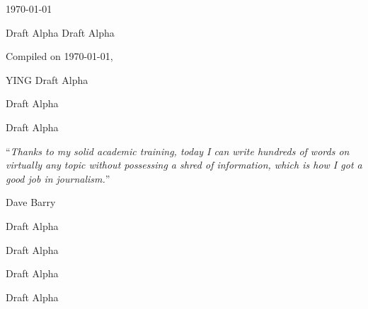 \documentclass[
11pt, %
english, %
singlespacing, %
parskip, %
headsepline, %
table
]{MastersDoctoralThesis} %
\newcommand{\drafting}{Draft Alpha}
\begin{document}
\begin{titlepage}
\begin{center}
\vfill

{\large \today}\\[3cm] %
 
\vfill
\end{center}
\end{titlepage}

\ifdefined\drafting
	\vspace*{0.2\textheight}
	\drafting

	Compiled on
	\noindent \today, \currenttime
	\bigbreak

	\hfill YING
\else
\fi
\ifdefined\drafting
\else

\fi

\ifdefined\drafting

\else
\fi

\ifdefined\drafting
\else

\vspace*{0.2\textheight}

\noindent\enquote{\itshape Thanks to my solid academic training, today I can write hundreds of words on virtually any topic without possessing a shred of information, which is how I got a good job in journalism.}\bigbreak

\hfill Dave Barry
\fi

\ifdefined\drafting
\else

\fi

\ifdefined\drafting
\else

\fi

\tableofcontents %

\ifdefined\drafting
\else
\listoffigures %
\listoftables %
\fi



\ifdefined\drafting
\else
\end{document}
